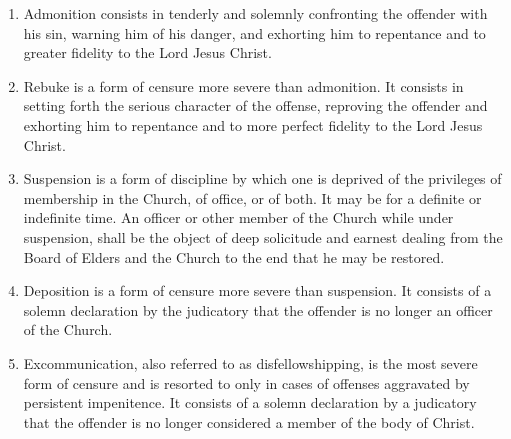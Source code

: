 \documentclass[
]{book}
\begin{document}
\begin{enumerate}
\def\labelenumi{\alph{enumi})}
\item
  Admonition consists in tenderly and solemnly confronting the offender with his sin, warning him of his danger, and exhorting him to repentance and to greater fidelity to the Lord Jesus Christ.
\item
  Rebuke is a form of censure more severe than admonition. It consists in setting forth the serious character of the offense, reproving the offender and exhorting him to repentance and to more perfect fidelity to the Lord Jesus Christ.
\item
  Suspension is a form of discipline by which one is deprived of the privileges of membership in the Church, of office, or of both. It may be for a definite or indefinite time. An officer or other member of the Church while under suspension, shall be the object of deep solicitude and earnest dealing from the Board of Elders and the Church to the end that he may be restored.
\item
  Deposition is a form of censure more severe than suspension. It consists of a solemn declaration by the judicatory that the offender is no longer an officer of the Church.
\item
  Excommunication, also referred to as disfellowshipping, is the most severe form of censure and is resorted to only in cases of offenses aggravated by persistent impenitence. It consists of a solemn declaration by a judicatory that the offender is no longer considered a member of the body of Christ.
\end{enumerate}
\end{document}
